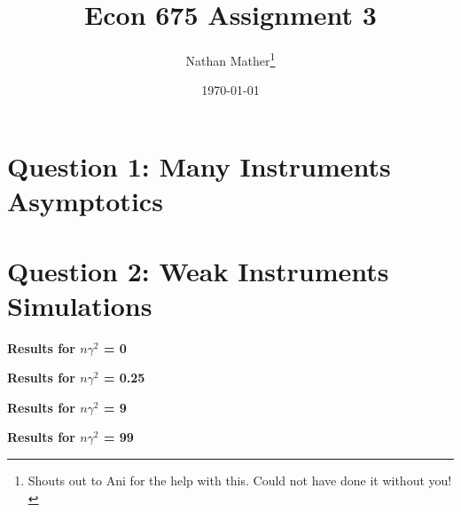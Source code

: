 \documentclass[11pt]{article}
\title{Econ 675 Assignment 3} %
\author{Nathan Mather\thanks{Shouts out to Ani  for the help with this. Could not have done it without you! } } %
\date{\today} %
\begin{document}
	
\maketitle %

\setcounter{tocdepth}{2} %

\tableofcontents %



\section{Question 1: Many Instruments Asymptotics}





\section{Question 2: Weak Instruments Simulations}

\begin{center}
	
	\centering
	
	\textbf{Results for $n \gamma^2$ = 0}\par\medskip
	\scalebox{1}{
		
	}
\end{center}

\begin{center}
	
	\centering
	
	\textbf{Results for $n \gamma^2$ = 0.25}\par\medskip
	\scalebox{1}{
		
	}
\end{center}

\begin{center}
	
	\centering
	
	\textbf{Results for $n \gamma^2$ = 9}\par\medskip
	\scalebox{1}{
		
	}
\end{center}

\begin{center}
	
	\centering
	
	\textbf{Results for $n \gamma^2$ = 99}\par\medskip
	\scalebox{1}{
		
	}
\end{center}



\end{document}
